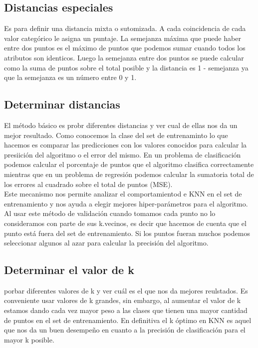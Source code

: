 \documentclass[titlepage,a4paper]{article}
\begin{document}
\subsection*{Distancias especiales}
Es para definir una distancia mixta o sutomizada. A cada coincidencia de cada valor categórico le asigna un puntaje. La semejanza máxima que puede haber entre dos puntos es el máximo de puntos que podemos sumar cuando todos los atributos son identicos. Luego la semejanza entre dos puntos se puede calcular como la suma de puntos sobre el total posible y la distancia es 1 - semejanza ya que la semejanza es un número entre 0 y 1. 

\subsection*{Determinar distancias}
El método básico es probr diferentes distancias y ver cual de ellas nos da un mejor resultado. Como conocemos la clase del set de entrenaminto lo que hacemos es comparar las predicciones con los valores conocidos para calcular la presiición del algoritmo o el error del mismo. En un problema de clasificación podemos calcular el  porcentaje de puntos que el algoritmo clasifica correctamente mientras que en un problema de regresión podemos calcular la sumatoria total de los errores al cuadrado sobre el total de puntos (MSE). \\

Este mecanismo nos permite analizar el comportamientod e KNN en el set de entrenamiento y nos ayuda a elegir mejores hiper-parámetros para el algoritmo. Al usar este método de validación cuando tomamos cada punto no lo consideramos con parte de sus k.vecinos, es decir que hacemos de cuenta que el punto está fuera del set de entrenamiento. Si los puntos fueran muchos podemos seleccionar algunos al azar para calcular la precisión del algoritmo. 

\subsection*{Determinar el valor de k} 
porbar diferentes valores de k y ver cuál es el que nos da mejores reulstados. Es conveniente usar valores de k grandes, sin embargo, al aumentar el valor de k estamos dando cada vez mayor peso a las clases que tienen una mayor cantidad de puntos en el set de entrenamiento. En definitiva el k óptimo en KNN es aquel que nos da un buen desempeño en cuanto a la precisión de clasificación para el mayor k posible. 
\end{document}
